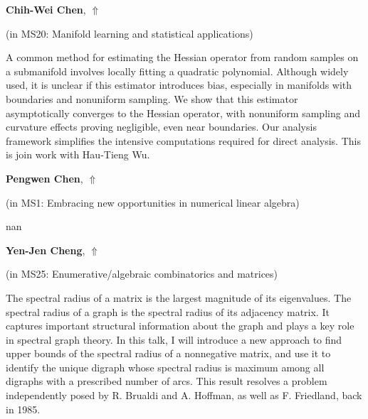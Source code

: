 \documentclass[ILAS2025-program.tex]{subfiles}
\begin{document}
     \hypertarget{down0152}{}\begin{ilasabstract}
    
    \textbf{Chih-Wei Chen},  \hfill \hyperlink{up0152}{$\Uparrow$}
    
    (in {\color{mstitle}MS20: Manifold learning and statistical applications})
        
        \mtskip
    A common method for estimating the Hessian operator from random samples on a submanifold involves locally fitting a quadratic polynomial. Although widely used, it is unclear if this estimator introduces bias, especially in manifolds with boundaries and nonuniform sampling. We show that this estimator asymptotically converges to the Hessian operator, with nonuniform sampling and curvature effects proving negligible, even near boundaries. Our analysis framework simplifies the intensive computations required for direct analysis. This is join work with Hau-Tieng Wu. 
\end{ilasabstract}
     \hypertarget{down0306}{}\begin{ilasabstract}
    
    \textbf{Pengwen Chen},  \hfill \hyperlink{up0306}{$\Uparrow$}
    
    (in {\color{mstitle}MS1: Embracing new opportunities in numerical linear algebra})
        
        \mtskip
    nan\end{ilasabstract}
     \hypertarget{down0228}{}\begin{ilasabstract}
    
    \textbf{Yen-Jen Cheng},  \hfill \hyperlink{up0228}{$\Uparrow$}
    
    (in {\color{mstitle}MS25: Enumerative/algebraic combinatorics and matrices})
        
        \mtskip
    The spectral radius of a matrix is the largest magnitude of its eigenvalues. The spectral radius of a graph is the spectral radius of its adjacency matrix. It captures important structural information about the graph and plays a key role in spectral graph theory. In this talk, I will introduce a new approach to find upper bounds of the spectral radius of a nonnegative matrix, and use it to
identify the unique digraph whose spectral radius is
maximum among all digraphs with a prescribed number
of arcs. This result resolves a problem 
independently posed by R. Brualdi and A. Hoffman, as well as F.
Friedland, back in 1985.
\end{ilasabstract}
\end{document}
